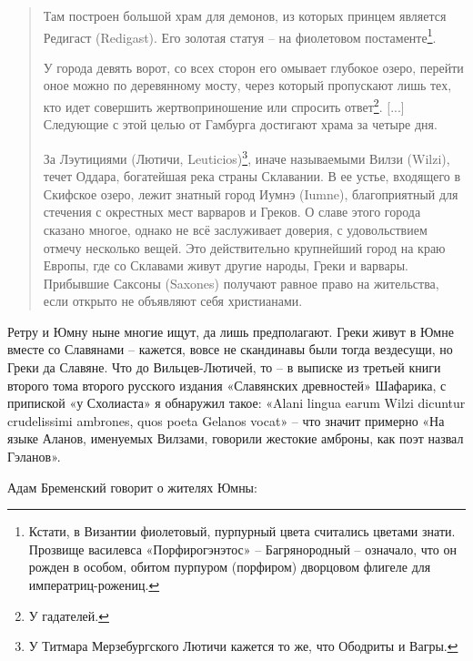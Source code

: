 \begin{quotation}
Там построен большой храм для демонов, из которых принцем является Редигаст (Redigast). Его золотая статуя – на фиолетовом постаменте\footnote{Кстати, в Византии фиолетовый,  пурпурный цвета считались цветами знати. Прозвище василевса «Порфирогэнэтос» – Багрянородный – означало, что он рожден в особом, обитом пурпуром (порфиром) дворцовом флигеле для императриц-рожениц.}.

У города девять ворот, со всех сторон его омывает глубокое озеро, перейти оное можно по деревянному мосту, через который пропускают лишь тех, кто идет совершить жертвоприношение или спросить ответ\footnote{У гадателей.}. [...] Следующие с этой целью от Гамбурга достигают храма за четыре дня.

За Лэутициями (Лютичи, Leuticios)\footnote{У Титмара Мерзебургского Лютичи кажется то же, что Ободриты и Вагры.}, иначе называемыми Вилзи (Wilzi), течет Оддара, богатейшая река страны Склавании. В ее устье, входящего в Скифское озеро, лежит знатный город Иумнэ (Iumne), благоприятный для стечения с окрестных мест варваров и Греков. О славе этого города сказано многое, однако не всё заслуживает доверия, с удовольствием отмечу несколько вещей. Это действительно крупнейший город на краю Европы, где со Склавами живут другие народы, Греки и варвары. Прибывшие Саксоны (Saxones) получают равное право на жительства, если открыто не объявляют себя христианами.
\end{quotation}

Ретру и Юмну ныне многие ищут, да лишь предполагают. Греки живут в Юмне вместе со Славянами – кажется, вовсе не скандинавы были тогда вездесущи, но Греки да Славяне. Что до Вильцев-Лютичей, то – в выписке из третьей книги второго тома второго русского издания «Славянских древностей» Шафарика, с припиской «у Схолиаста» я обнаружил такое: «Alani lingua earum Wilzi dicuntur crudelissimi ambrones, quos poeta Gelanos vocat» – что значит примерно «На языке Аланов, именуемых Вилзами, говорили жестокие амброны, как поэт назвал Гэланов».

Адам Бременский говорит о жителях Юмны:

